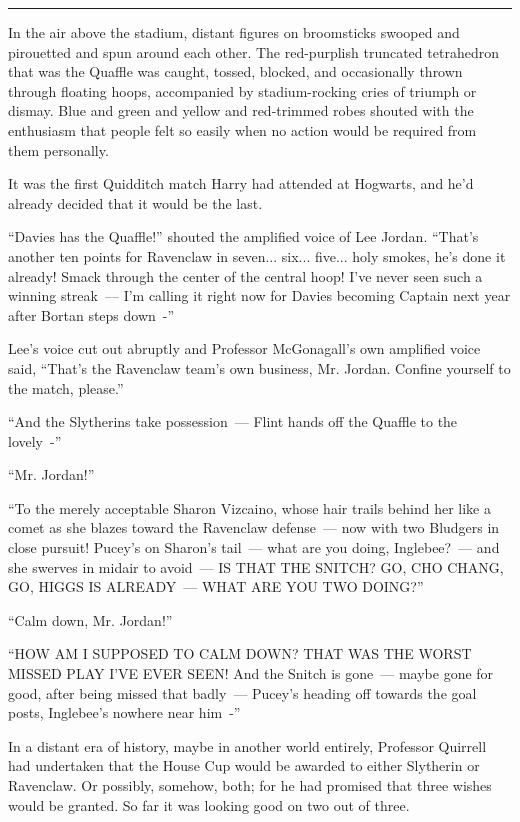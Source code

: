 \begin{center}\rule{3in}{0.4pt}\end{center}

In the air above the stadium, distant figures on broomsticks swooped and pirouetted and spun around each other. The red-purplish truncated tetrahedron that was the Quaffle was caught, tossed, blocked, and occasionally thrown through floating hoops, accompanied by stadium-rocking cries of triumph or dismay. Blue and green and yellow and red-trimmed robes shouted with the enthusiasm that people felt so easily when no action would be required from them personally.

It was the first Quidditch match Harry had attended at Hogwarts, and he'd already decided that it would be the last.

``Davies has the Quaffle!'' shouted the amplified voice of Lee Jordan. ``That's another ten points for Ravenclaw in seven... six... five... holy smokes, he's done it already! Smack through the center of the central hoop! I've never seen such a winning streak~--- I'm calling it right now for Davies becoming Captain next year after Bortan steps down~-''

Lee's voice cut out abruptly and Professor McGonagall's own amplified voice said, ``That's the Ravenclaw team's own business, Mr. Jordan. Confine yourself to the match, please.''

``And the Slytherins take possession~--- Flint hands off the Quaffle to the lovely~-''

``Mr. Jordan!''

``To the merely acceptable Sharon Vizcaino, whose hair trails behind her like a comet as she blazes toward the Ravenclaw defense~--- now with two Bludgers in close pursuit! Pucey's on Sharon's tail~--- what are you doing, Inglebee?~--- and she swerves in midair to avoid~--- IS THAT THE SNITCH? GO, CHO CHANG, GO, HIGGS IS ALREADY~--- WHAT ARE YOU TWO DOING?''

``Calm down, Mr. Jordan!''

``HOW AM I SUPPOSED TO CALM DOWN? THAT WAS THE WORST MISSED PLAY I'VE EVER SEEN! And the Snitch is gone~--- maybe gone for good, after being missed that badly~--- Pucey's heading off towards the goal posts, Inglebee's nowhere near him~-''

In a distant era of history, maybe in another world entirely, Professor Quirrell had undertaken that the House Cup would be awarded to either Slytherin or Ravenclaw. Or possibly, somehow, both; for he had promised that three wishes would be granted. So far it was looking good on two out of three.


